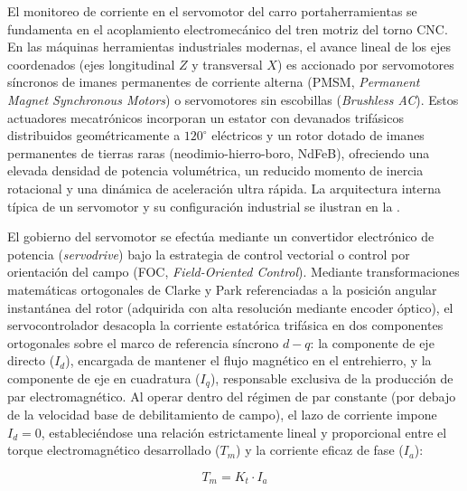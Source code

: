 El monitoreo de corriente en el servomotor del carro portaherramientas se fundamenta en el acoplamiento electromecánico del tren motriz del torno CNC. En las máquinas herramientas industriales modernas, el avance lineal de los ejes coordenados (ejes longitudinal $Z$ y transversal $X$) es accionado por servomotores síncronos de imanes permanentes de corriente alterna (PMSM, \textit{Permanent Magnet Synchronous Motors}) o servomotores sin escobillas (\textit{Brushless AC}). Estos actuadores mecatrónicos incorporan un estator con devanados trifásicos distribuidos geométricamente a $120^\circ$ eléctricos y un rotor dotado de imanes permanentes de tierras raras (neodimio-hierro-boro, NdFeB), ofreciendo una elevada densidad de potencia volumétrica, un reducido momento de inercia rotacional y una dinámica de aceleración ultra rápida. La arquitectura interna típica de un servomotor y su configuración industrial se ilustran en la .


El gobierno del servomotor se efectúa mediante un convertidor electrónico de potencia (\textit{servodrive}) bajo la estrategia de control vectorial o control por orientación del campo (FOC, \textit{Field-Oriented Control}). Mediante transformaciones matemáticas ortogonales de Clarke y Park referenciadas a la posición angular instantánea del rotor (adquirida con alta resolución mediante encoder óptico), el servocontrolador desacopla la corriente estatórica trifásica en dos componentes ortogonales sobre el marco de referencia síncrono $d-q$: la componente de eje directo ($I_d$), encargada de mantener el flujo magnético en el entrehierro, y la componente de eje en cuadratura ($I_q$), responsable exclusiva de la producción de par electromagnético. Al operar dentro del régimen de par constante (por debajo de la velocidad base de debilitamiento de campo), el lazo de corriente impone $I_d = 0$, estableciéndose una relación estrictamente lineal y proporcional entre el torque electromagnético desarrollado ($T_m$) y la corriente eficaz de fase ($I_a$):

\begin{equation}
T_m = K_t \cdot I_a
\label{eq:par_motor}
\end{equation}

